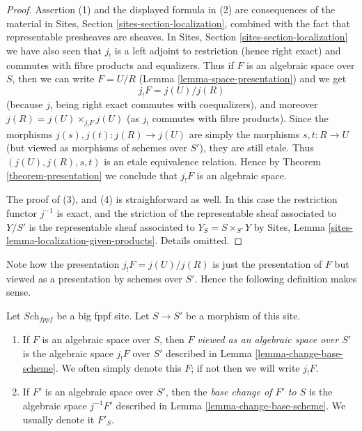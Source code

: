\begin{proof}
Assertion (1) and the displayed formula in (2) are consequences of the
material in Sites, Section \ref{sites-section-localization}, combined with
the fact that representable presheaves are sheaves.
In Sites, Section \ref{sites-section-localization} we have also seen
that $j_!$ is a left adjoint to restriction (hence right exact) and
commutes with fibre products and equalizers. Thus if $F$ is an algebraic
space over $S$, then we can write $F = U/R$
(Lemma \ref{lemma-space-presentation})
and we get
$$
j_!F = j(U)/j(R)
$$
(because $j_!$ being right exact commutes with coequalizers), and moreover
$j(R) = j(U) \times_{j_!F} j(U)$ (as $j_!$ commutes with fibre products).
Since the morphisms $j(s), j(t) : j(R) \to j(U)$ are simply the morphisms
$s, t : R \to U$ (but viewed as morphisms of schemes over $S'$), they
are still etale. Thus $(j(U), j(R), s, t)$ is an etale equivalence relation.
Hence by Theorem \ref{theorem-presentation} we
conclude that $j_!F$ is an algebraic space.

\medskip\noindent
The proof of (3), and (4) is straighforward as well. In this case the
restriction functor $j^{-1}$ is exact, and the striction of the representable
sheaf associated to $Y/S'$ is the representable sheaf associated to
$Y_S = S \times_{S'} Y$ by
Sites, Lemma \ref{sites-lemma-localization-given-products}.
Details omitted.
\end{proof}

\noindent
Note how the presentation $j_!F = j(U)/j(R)$ is just the presentation
of $F$ but viewed as a presentation by schemes over $S'$. Hence the
following definition makes sense.

\begin{definition}
\label{definition-base-change}
Let $\textit{Sch}_{fppf}$ be a big fppf site.
Let $S \to S'$ be a morphism of this site.
\begin{enumerate}
\item If $F$ is an algebraic space over $S$, then $F$
{\it viewed as an algebraic space over $S'$}
is the algebraic space $j_!F$ over $S'$ described in
Lemma \ref{lemma-change-base-scheme}. We often simply denote this
$F$; if not then we will write $j_!F$.
\item If $F'$ is an algebraic space over $S'$, then the
{\it base change of $F'$ to $S$} is the
algebraic space $j^{-1}F'$ described in
Lemma \ref{lemma-change-base-scheme}. We usually denote it
$F'_S$.
\end{enumerate}
\end{definition}

